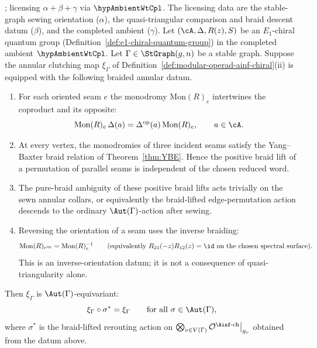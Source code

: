 \begin{proposition}
\ClaimStatusProvedHere; licensing $\alpha+\beta+\gamma$ via
$\hypAmbientWtCpl$.
\label{prop:qt-equivariance}
\noindent The licensing data are the stable-graph sewing orientation
\textup{(}$\alpha$\textup{)}, the quasi-triangular comparison and braid
descent datum \textup{(}$\beta$\textup{)}, and the completed ambient
\textup{(}$\gamma$\textup{)}.
%
%
%
%
%
%
Let $(\cA, \Delta, R(z), S)$ be an $E_1$-chiral quantum group
\textup{(}Definition~\textup{\ref{def:e1-chiral-quantum-group}}\textup{)}
in the completed ambient $\hypAmbientWtCpl$.  Let
$\Gamma\in\StGraph(g,n)$ be a stable graph.  Suppose the annular
clutching map $\xi_\Gamma$ of
Definition~\textup{\ref{def:modular-operad-ainf-chiral}(ii)}
is equipped with the following braided annular datum.
\begin{enumerate}[label=\textup{(\roman*)}]
\item For each oriented seam $e$ the monodromy
 $\mathrm{Mon}(R)_e$ intertwines the coproduct and its opposite:
 \[
 \mathrm{Mon}(R)_e\,\Delta(a)
 =
 \Delta^{\mathrm{op}}(a)\,\mathrm{Mon}(R)_e,
 \qquad a\in\cA .
 \]
\item At every vertex, the monodromies of three incident seams satisfy
 the Yang--Baxter braid relation of
 Theorem~\textup{\ref{thm:YBE}}.  Hence the positive braid lift of a
 permutation of parallel seams is independent of the chosen reduced
 word.
\item The pure-braid ambiguity of these positive braid lifts acts
 trivially on the sewn annular collars, or equivalently the
 braid-lifted edge-permutation action descends to the ordinary
 $\Aut(\Gamma)$-action after sewing.
\item Reversing the orientation of a seam uses the inverse braiding:
 \[
 \mathrm{Mon}(R)_{e^{\mathrm{op}}}
 =
 \mathrm{Mon}(R)_e^{-1}
 \qquad
 \textup{(equivalently }R_{21}(-z)R_{12}(z)=\id
 \textup{ on the chosen spectral surface).}
 \]
 This is an inverse-orientation datum; it is not a consequence of
 quasi-triangularity alone.
\end{enumerate}
Then $\xi_\Gamma$ is $\Aut(\Gamma)$-equivariant:
\[
\xi_\Gamma \circ \sigma^\ast = \xi_\Gamma
\qquad \text{for all } \sigma \in \Aut(\Gamma),
\]
where $\sigma^\ast$ is the braid-lifted rerouting action on
$\bigotimes_{v \in V(\Gamma)}
\mathcal{O}^{\Ainf\text{-ch}}\big|_{g_v}$
obtained from the datum above.
\end{proposition}

